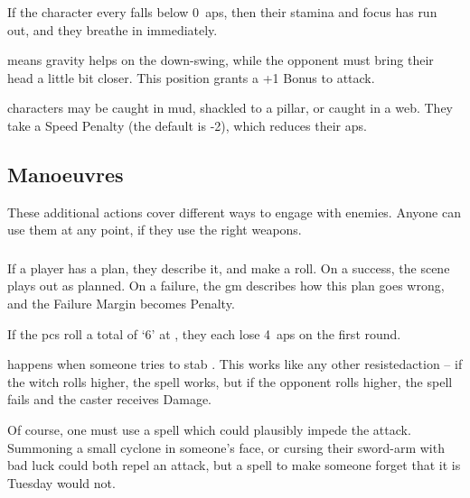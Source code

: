 \begin{multicols}{2}
If the character every falls below 0~\glspl{ap}, then their stamina and focus has run out, and they breathe in immediately.

means gravity helps on the down-swing, while the opponent must bring their head a little bit closer.
This position grants a +1 Bonus to attack.

\label{trapped}
characters may be caught in mud, shackled to a pillar, or caught in a web.
They take a Speed Penalty (the default is -2), which reduces their \glspl{ap}.
\label{prone}

\subsection{Manoeuvres}
\label{manoeuvres}

These additional actions cover different ways to engage with enemies.
Anyone can use them at any point, if they use the right weapons.

\subsubsection{}

If a player has a plan, they describe it, and make a roll.
On a success, the scene plays out as planned.
On a failure, the \gls{gm} describes how this plan goes wrong, and the Failure Margin becomes  Penalty.

\begin{exampletext}
  If the \glspl{pc} roll a total of `6' at \tn[10], they each lose 4~\glspl{ap} on the first \gls{round}.
\end{exampletext}

happens when someone tries to stab .
This works like any other \gls{resistedaction} -- if the \gls{witch} rolls higher, the spell works, but if the opponent rolls higher, the spell fails and the caster receives Damage.

{}

Of course, one must use a spell which could plausibly impede the attack.
Summoning a small cyclone in someone's face, or cursing their sword-arm with bad luck could both repel an attack, but a spell to make someone forget that it is Tuesday would not.


\end{multicols}
